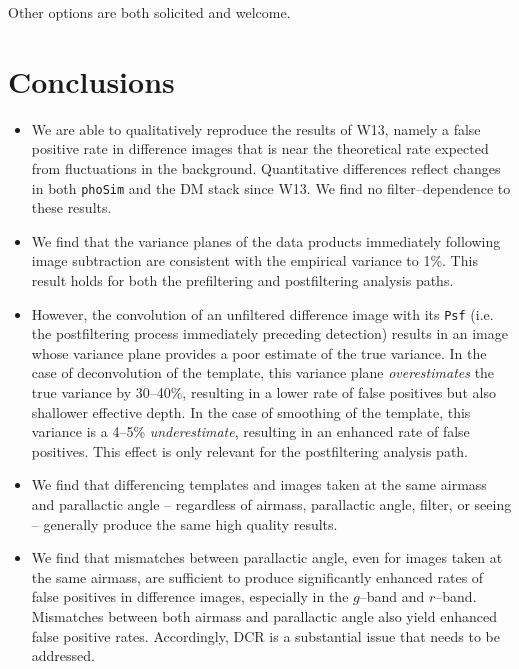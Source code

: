 \documentclass[DM,toc]{lsstdoc}
\begin{document}
Other options are both solicited and welcome.

\section{Conclusions}

\begin{itemize}

\item We are able to qualitatively reproduce the results of W13,
  namely a false positive rate in difference images that is near the
  theoretical rate expected from fluctuations in the background.
  Quantitative differences reflect changes in both {\tt phoSim} and
  the DM stack since W13.  We find no filter--dependence to these
  results.

\item We find that the variance planes of the data products
  immediately following image subtraction are consistent with the
  empirical variance to 1\%.  This result holds for both the
  prefiltering and postfiltering analysis paths.

\item However, the convolution of an unfiltered difference image with
  its {\tt Psf} (i.e. the postfiltering process immediately preceding
  detection) results in an image whose variance plane provides a poor
  estimate of the true variance.  In the case of deconvolution of the
  template, this variance plane {\it overestimates} the true variance
  by 30--40\%, resulting in a lower rate of false positives but also
  shallower effective depth.  In the case of smoothing of the
  template, this variance is a 4--5\% {\it underestimate}, resulting
  in an enhanced rate of false positives.  This effect is only
  relevant for the postfiltering analysis path.

\item We find that differencing templates and images taken at the same
  airmass and parallactic angle -- regardless of airmass, parallactic
  angle, filter, or seeing -- generally produce the same high quality
  results.

\item We find that mismatches between parallactic angle, even for
  images taken at the same airmass, are sufficient to produce
  significantly enhanced rates of false positives in difference
  images, especially in the $g$--band and $r$--band.  Mismatches
  between both airmass and parallactic angle also yield enhanced false
  positive rates.  Accordingly, DCR is a substantial issue that needs
  to be addressed.


\end{itemize}
\end{document}
